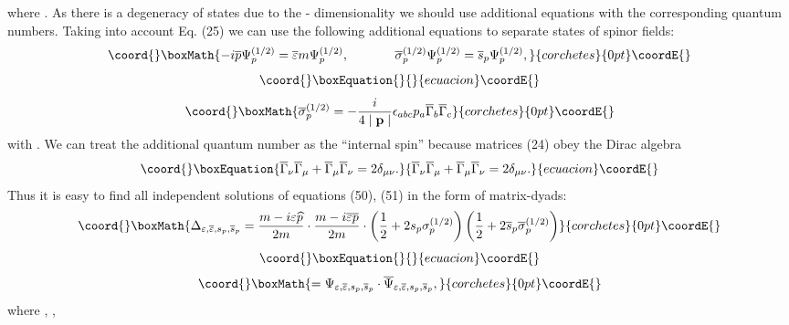 \documentclass[a4paper,12pt]{article}
\begin{document}
where \coordHE{}. As there is a degeneracy of states due to the \coordHE{} -
dimensionality we should use additional equations with the corresponding
quantum numbers. Taking into account Eq. (25) we can use the following
additional equations to separate states of spinor fields:
\[\coord{}\boxMath{
-i\overline{p}\Psi _p^{(1/2)}=\overline{\varepsilon }m\Psi
_p^{(1/2)} ,\hspace{0.5in}\overline{\sigma }_p^{(1/2)}\Psi
_p^{(1/2)}=\overline{s}_p\Psi _p^{(1/2)} ,
}{corchetes}{0pt}\coordE{}\]
\vspace{-8mm}
\begin{equation}\coord{}\boxEquation{  \label{51}
}{  }{ecuacion}\coordE{}\end{equation}
\vspace{-8mm}
\[\coord{}\boxMath{
\overline{\sigma }_p^{(1/2)}=-\frac i{4\mid \mathbf{p}\mid }\epsilon
_{abc}p_a\overline{\Gamma }_b\overline{\Gamma }_c
}{corchetes}{0pt}\coordE{}\]
with \coordHE{}. We can treat the additional quantum
number \coordHE{} as the ``internal spin'' because matrices
(24) obey the Dirac algebra
\begin{equation}\coord{}\boxEquation{
\overline{\Gamma }_\nu \overline{\Gamma }_\mu +\overline{\Gamma
}_\mu \overline{\Gamma }_\nu =2\delta _{\mu \nu } . \label{52}
}{
\overline{\Gamma }_\nu \overline{\Gamma }_\mu +\overline{\Gamma
}_\mu \overline{\Gamma }_\nu =2\delta _{\mu \nu } . }{ecuacion}\coordE{}\end{equation}
Thus it is easy to find all independent solutions of equations (50), (51) in
the form of matrix-dyads:
\[\coord{}\boxMath{
\Delta _{\varepsilon ,\overline{\varepsilon
},s_p,\overline{s}_p}=\frac{ m-i\varepsilon \widehat{p}}{2m}\cdot
\frac{m-i\overline{\varepsilon } \overline{p}}{2m}\cdot \left(
\frac 12+2s_p\sigma _p^{(1/2)}\right) \left( \frac
12+2\overline{s}_p\overline{\sigma }_p^{(1/2)}\right)
}{corchetes}{0pt}\coordE{}\]
\vspace{-8mm}
\begin{equation}\coord{}\boxEquation{  \label{53}
}{  }{ecuacion}\coordE{}\end{equation}
\vspace{-8mm}
\[\coord{}\boxMath{
=\Psi _{\varepsilon ,\overline{\varepsilon
},s_p,\overline{s}_p}\cdot \overline{\Psi }_{\varepsilon
,\overline{\varepsilon },s_p,\overline{s}_p} ,
}{corchetes}{0pt}\coordE{}\]
where \coordHE{}, \coordHE{},
\end{document}
